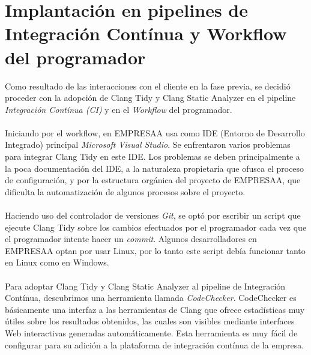 \documentclass[12pt]{extreport} %
\begin{document}
\section{Implantación en pipelines de Integración Contínua y Workflow del programador}

Como resultado de las interacciones con el cliente en la fase previa,
se decidió proceder con la adopción de Clang Tidy y Clang Static
Analyzer en el pipeline \emph{Integración Contínua (CI)} y en el
\emph{Workflow} del programador.

\paragraph{}
Iniciando por el workflow, en EMPRESAA usa como IDE (Entorno de
Desarrollo Integrado) principal \emph{Microsoft Visual Studio}. Se
enfrentaron varios problemas para integrar Clang Tidy en este IDE.
Los problemas se deben principalmente a la poca documentación del IDE,
a la naturaleza propietaria que ofusca el proceso de configuración, y
por la estructura orgánica del proyecto de EMPRESAA, que dificulta la
automatización de algunos procesos sobre el proyecto.

\paragraph{}
Haciendo uso del controlador de versiones \emph{Git}, se optó por
escribir un script que ejecute Clang Tidy sobre los cambios efectuados
por el programador cada vez que el programador intente hacer un
\emph{commit}. Algunos desarrolladores en EMPRESAA optan por usar
Linux, por lo tanto este script debía funcionar tanto en Linux como en Windows.

\paragraph{}
Para adoptar Clang Tidy y Clang Static Analyzer al pipeline de
Integración Contínua, descubrimos una herramienta llamada
\emph{CodeChecker}. CodeChecker es básicamente una interfaz a las
herramientas de Clang que ofrece estadísticas muy útiles sobre los
resultados obtenidos, las cuales son visibles mediante interfaces Web
interactivas generadas automáticamente. Esta herramienta es muy fácil
de configurar para su adición a la plataforma de integración contínua
de la empresa.
\end{document}
